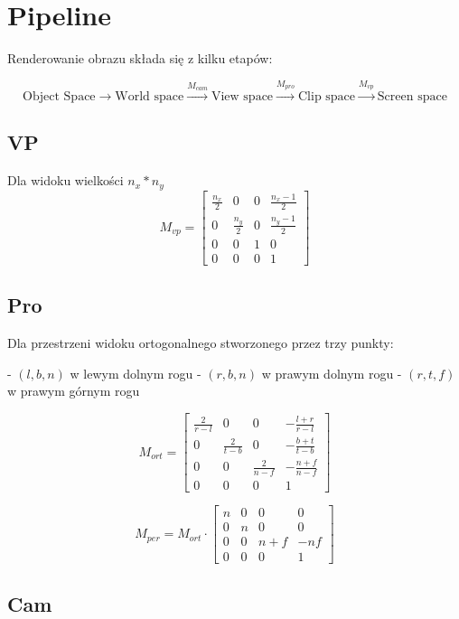 \documentclass{../notatki}
\begin{document}
\section{Pipeline}

Renderowanie obrazu składa się z kilku etapów:

$$
\text{Object Space} \rightarrow \text{World space} \overset{M_{cam}}{\rightarrow} \text{View space} \overset{M_{pro}}{\rightarrow} \text{Clip space} \overset{M_{vp}}{\rightarrow} \text{Screen space}
$$

\subsection{VP}

Dla widoku wielkości $n_x * n_y$
$$
M_{vp} = \begin{bmatrix} 
    \frac{n_x}{2} & 0 & 0 & \frac{n_x - 1}{2} \\
    0 & \frac{n_y}{2} & 0 & \frac{n_y - 1}{2} \\
    0 & 0 & 1 & 0 \\
    0 & 0 & 0 & 1 
\end{bmatrix}
$$

\subsection{Pro}

Dla przestrzeni widoku ortogonalnego stworzonego przez trzy punkty:

- $(l,b,n)$ w lewym dolnym rogu
- $(r,b,n)$ w prawym dolnym rogu
- $(r,t,f)$ w prawym górnym rogu

$$
M_{ort} = \begin{bmatrix} 
    \frac{2}{r - l} & 0 & 0 & -\frac{l + r}{r - l} \\
    0 & \frac{2}{t - b} & 0 & -\frac{b + t}{t - b} \\
    0 & 0 & \frac{2}{n - f} & -\frac{n + f}{n - f} \\
    0 & 0 & 0 & 1 
\end{bmatrix}
$$

$$
M_{per} = M_{ort} \cdot \begin{bmatrix} 
    n & 0 & 0 & 0 \\
    0 & n & 0 & 0 \\
    0 & 0 & n + f & -nf \\
    0 & 0 & 0 & 1 
\end{bmatrix}
$$

\subsection{Cam}
\end{document}
